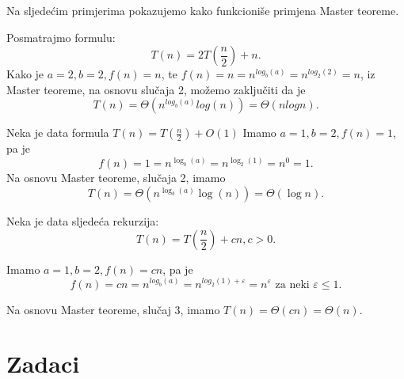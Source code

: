 Na sljedećim primjerima pokazujemo kako funkcioniše primjena Master teoreme. %
 

\begin{example}
	Posmatrajmo formulu:
	$$T(n) = 2T\left(\frac{n}{2}\right) + n.$$
	Kako je $a = 2, b = 2, f(n) = n$, te $f(n) = n = n^{log_b (a)} = n^{log_2 (2)} = n$, iz Master teoreme, na osnovu slučaja 2,  možemo zaključiti da je 
	$$T(n) = \Theta (n^{log_b (a)} log (n)) = \Theta (n log n).$$
\end{example}

\begin{example} Neka je data formula
	$T(n) = T(\frac{n}{2}) + O(1)$
	Imamo $a = 1, b = 2, f(n) = 1$, pa je $$f(n) = 1 = n^{\log_b (a)} = n^{\log_2 (1)} = n^{0} = 1.$$
	Na osnovu Master teoreme, slučaja 2, imamo
	$$T(n) = \Theta (n^{\log_b (a)} \log (n)) = \Theta (\log n).$$
\end{example}

\begin{example}
	Neka je data sljedeća rekurzija:
	$$T(n) = T(\frac{n}{2}) + cn, c >0.$$
	
	Imamo $a = 1, b = 2, f(n) = cn$, pa je 
	$$f(n) = cn = n^{log_b (a)} = n^{log_2 (1) + \varepsilon} = n^{\varepsilon} \text{ za neki } \varepsilon \leq 1.$$
	
	Na osnovu Master teoreme, slučaj 3, imamo %
	$T(n)  = \Theta (cn) = \Theta(n).$
\end{example}

\section*{Zadaci}

